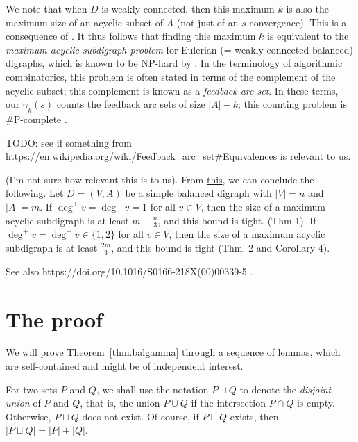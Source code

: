 \documentclass[numbers=enddot,12pt,final,onecolumn,notitlepage]{scrartcl}%
\theoremstyle{definition}
\newenvironment{noncompile}{}{}
\theoremstyle{plainsl}
\begin{document}
\begin{enumerate}
We note that when $D$ is weakly connected, then this maximum $k$ is also the
maximum size of an acyclic subset of $A$ (not just of an $s$-convergence).
This is a consequence of \cite[Theorem 3.4]{PerPha15}. It thus follows that
finding this maximum $k$ is equivalent to the \emph{maximum acyclic subdigraph
problem} for Eulerian (= weakly connected balanced) digraphs, which is known
to be NP-hard by \cite[Theorem 3.10]{PerPha15}. In the terminology of
algorithmic combinatorics, this problem is often stated in terms of the
complement of the acyclic subset; this complement is known as a \emph{feedback
arc set}. In these terms, our $\gamma_{k}\left(  s\right)  $ counts the
feedback arc sets of size $\left\vert A\right\vert -k$; this counting problem
is \#P-complete \cite[Theorem 5]{Perrot19}.
\end{enumerate}

\begin{noncompile}
TODO: see if something from
https://en.wikipedia.org/wiki/Feedback\_arc\_set\#Equivalences is relevant to us.

(I'm not sure how relevant this is to us). From
\href{https://link.springer.com/chapter/10.1007/978-3-642-45043-3_26}{this},
we can conclude the following. Let $D=(V,A)$ be a simple balanced digraph with
$|V|=n$ and $|A|=m$. If $\deg^{+}v=\deg^{-}v=1$ for all $v\in V$, then the
size of a maximum acyclic subdigraph is at least $m-\frac{n}{3}$, and this
bound is tight. (Thm 1). If $\deg^{+}v=\deg^{-}v\in\{1,2\}$ for all $v\in V$,
then the size of a maximum acyclic subdigraph is at least $\frac{2m}{3}$, and
this bound is tight (Thm. 2 and Corollary 4).

See also https://doi.org/10.1016/S0166-218X(00)00339-5 .
\end{noncompile}

\section{The proof}

We will prove Theorem~\ref{thm.balgamma} through a sequence of lemmas, which
are self-contained and might be of independent interest.

For two sets $P$ and $Q$, we shall use the notation $P\sqcup Q$ to denote the
\emph{disjoint union} of $P$ and $Q$, that is, the union $P\cup Q$ if the
intersection $P\cap Q$ is empty. Otherwise, $P\sqcup Q$ does not exist. Of
course, if $P\sqcup Q$ exists, then $\left\vert P\sqcup Q\right\vert
=\left\vert P\right\vert +\left\vert Q\right\vert $.
\end{document}
